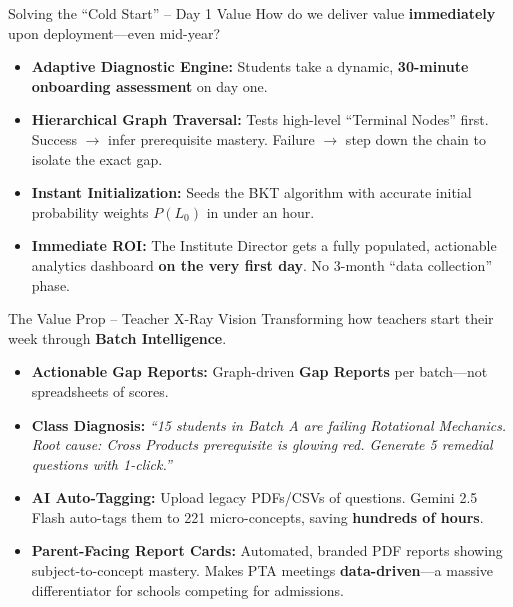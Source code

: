\documentclass[aspectratio=169, 10pt]{beamer}
\newcommand{\bspace}{\vspace{0.3em}}
\begin{document}
\begin{frame}{Solving the ``Cold Start'' -- Day 1 Value}
  How do we deliver value \textbf{immediately} upon deployment---even mid-year?

  \bspace
  \begin{itemize}
    \setlength\itemsep{0.5em}
    \item \textbf{Adaptive Diagnostic Engine:} Students take a dynamic, \textbf{30-minute onboarding assessment} on day one.

    \item \textbf{Hierarchical Graph Traversal:} Tests high-level ``Terminal Nodes'' first. Success $\rightarrow$ infer prerequisite mastery. Failure $\rightarrow$ step down the chain to isolate the exact gap.

    \item \textbf{Instant Initialization:} Seeds the BKT algorithm with accurate initial probability weights $P(L_0)$ in under an hour.

    \item \textbf{Immediate ROI:} The Institute Director gets a fully populated, actionable analytics dashboard \textbf{on the very first day}. No 3-month ``data collection'' phase.
  \end{itemize}
\end{frame}

\begin{frame}{The Value Prop -- Teacher X-Ray Vision}
  Transforming how teachers start their week through \textbf{Batch Intelligence}.

  \bspace
  \begin{itemize}
    \setlength\itemsep{0.45em}
    \item \textbf{Actionable Gap Reports:} Graph-driven \textbf{Gap Reports} per batch---not spreadsheets of scores.

    \item \textbf{Class Diagnosis:} \emph{``15 students in Batch A are failing Rotational Mechanics. Root cause: Cross Products prerequisite is glowing red. Generate 5 remedial questions with 1-click.''}

    \item \textbf{AI Auto-Tagging:} Upload legacy PDFs/CSVs of questions. Gemini 2.5 Flash auto-tags them to 221 micro-concepts, saving \textbf{hundreds of hours}.

    \item \textbf{Parent-Facing Report Cards:} Automated, branded PDF reports showing subject-to-concept mastery. Makes PTA meetings \textbf{data-driven}---a massive differentiator for schools competing for admissions.
  \end{itemize}
\end{frame}
\end{document}
